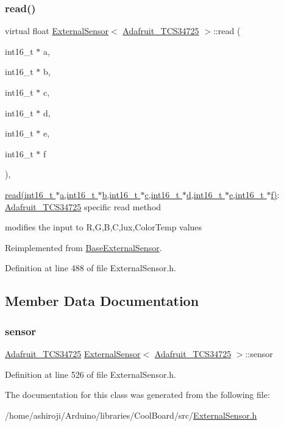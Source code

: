 \subsubsection{\texorpdfstring{read()}{read()}}
{\footnotesize\ttfamily virtual float \hyperlink{class_external_sensor}{External\+Sensor}$<$ \hyperlink{class_adafruit___t_c_s34725}{Adafruit\+\_\+\+T\+C\+S34725} $>$\+::read (\begin{DoxyParamCaption}\item[{int16\+\_\+t $\ast$}]{a,  }\item[{int16\+\_\+t $\ast$}]{b,  }\item[{int16\+\_\+t $\ast$}]{c,  }\item[{int16\+\_\+t $\ast$}]{d,  }\item[{int16\+\_\+t $\ast$}]{e,  }\item[{int16\+\_\+t $\ast$}]{f }\end{DoxyParamCaption})\hspace{0.3cm}{\ttfamily [inline]}, {\ttfamily [virtual]}}

\hyperlink{class_external_sensor_3_01_adafruit___t_c_s34725_01_4_a129ee155fe53aa069cb972bcf52e25f7}{read(int16\+\_\+t $\ast$a,int16\+\_\+t $\ast$b,int16\+\_\+t $\ast$c,int16\+\_\+t $\ast$d,int16\+\_\+t $\ast$e,int16\+\_\+t $\ast$f)}\+: \hyperlink{class_adafruit___t_c_s34725}{Adafruit\+\_\+\+T\+C\+S34725} specific read method

modifies the input to R,G,B,C,lux,Color\+Temp values 

Reimplemented from \hyperlink{class_base_external_sensor_a1867ba10561be26f2f5ec29421e6fb21}{Base\+External\+Sensor}.



Definition at line 488 of file External\+Sensor.\+h.



\subsection{Member Data Documentation}
\mbox{\label{class_external_sensor_3_01_adafruit___t_c_s34725_01_4_aa1c5cc9eec53c08392f63346c9a4cd47}} 
\subsubsection{\texorpdfstring{sensor}{sensor}}
{\footnotesize\ttfamily \hyperlink{class_adafruit___t_c_s34725}{Adafruit\+\_\+\+T\+C\+S34725} \hyperlink{class_external_sensor}{External\+Sensor}$<$ \hyperlink{class_adafruit___t_c_s34725}{Adafruit\+\_\+\+T\+C\+S34725} $>$\+::sensor\hspace{0.3cm}{\ttfamily [private]}}



Definition at line 526 of file External\+Sensor.\+h.



The documentation for this class was generated from the following file\+:\begin{DoxyCompactItemize}
\item 
/home/ashiroji/\+Arduino/libraries/\+Cool\+Board/src/\hyperlink{_external_sensor_8h}{External\+Sensor.\+h}\end{DoxyCompactItemize}
